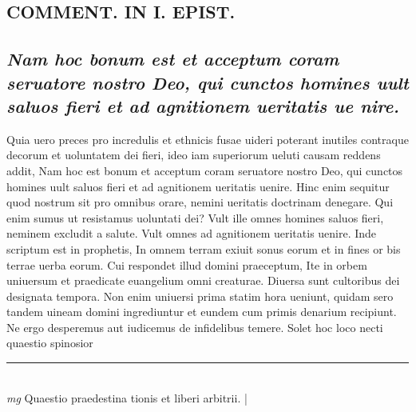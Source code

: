 \documentclass{article}
\begin{document}
\begin{pages}
\section*{COMMENT. IN I. EPIST. }
{}
\subsection*{\textit{Nam hoc bonum est et acceptum coram seruatore nostro Deo, qui cunctos homines uult saluos fieri et ad agnitionem ueritatis ue nire. }}\pstart Quia uero preces pro incredulis et ethnicis fusae uideri poterant inutiles contraque decorum et uoluntatem dei fieri, ideo iam superiorum ueluti causam reddens addit, Nam hoc est bonum et acceptum coram seruatore nostro Deo, qui cunctos homines uult saluos fieri et ad agnitionem ueritatis uenire. Hinc enim sequitur quod nostrum sit pro omnibus orare, nemini ueritatis doctrinam denegare. Qui enim sumus ut resistamus uoluntati dei? Vult ille omnes homines saluos fieri, neminem excludit a salute. Vult omnes ad agnitionem ueritatis uenire. Inde scriptum est in prophetis, In omnem terram exiuit sonus eorum et in fines or bis terrae uerba eorum. Cui respondet illud domini praeceptum, Ite in orbem uniuersum et praedicate euangelium omni creaturae. Diuersa sunt cultoribus dei designata tempora. Non enim uniuersi prima statim hora ueniunt, quidam sero tandem uineam domini ingrediuntur et eundem cum primis denarium recipiunt. Ne ergo desperemus aut iudicemus de infidelibus temere. Solet hoc loco necti quaestio spinosior  \pend
\vspace{0.5cm}\noindent
\vspace{0.2cm}\rule{1cm}{0.2pt}\\ 
\hspace{0.2cm}\textit{mg}
\footnotesize Quaestio praedestina tionis et liberi arbitrii. 
\normalsize| 

\end{pages}
\end{document}
